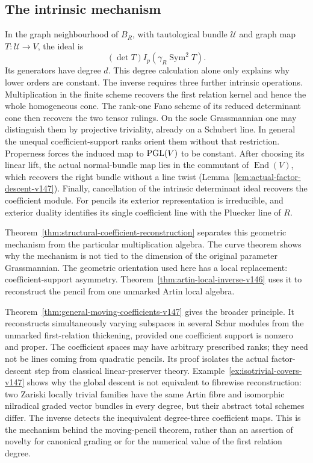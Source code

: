 \documentclass[11pt,reqno]{amsart}
\numberwithin{equation}{section}
\theoremstyle{definition}\newtheorem{definition}[theorem]{Definition}
\theoremstyle{remark}\newtheorem{remark}[theorem]{Remark}
\DeclareMathOperator{\Sym}{Sym}\DeclareMathOperator{\Gr}{Gr}
\DeclareMathOperator{\End}{End}
\begin{document}
\subsection{The intrinsic mechanism}
In the graph neighbourhood of \(B_R\), with tautological bundle
\(\mathcal U\) and graph map \(T:\mathcal U\to V\), the ideal is
\[
                 (\det T)I_p(\gamma_R\Sym^2T).
\]
Its generators have degree \(d\).  This degree calculation alone
only explains why lower orders are constant.  The inverse requires
three further intrinsic operations.  Multiplication in the finite
scheme recovers the first relation kernel and hence the whole
homogeneous cone.  The rank-one Fano scheme of its reduced determinant
cone then recovers the two tensor rulings.  On the socle Grassmannian
one may distinguish them by projective triviality, already on a
Schubert line.  In general the unequal coefficient-support ranks
orient them without that restriction.  Properness forces the induced
map to \(\operatorname{PGL}(V)\) to be constant.  After choosing its linear lift,
the actual normal-bundle map lies in the commutant of \(\End(V)\),
which recovers the right bundle without a line twist
(Lemma~\ref{lem:actual-factor-descent-v147}).  Finally, cancellation of the intrinsic
determinant ideal recovers the coefficient module.  For pencils its
exterior representation is irreducible, and exterior duality identifies
its single coefficient line with the Pluecker line of \(R\).

Theorem~\ref{thm:structural-coefficient-reconstruction} separates this
geometric mechanism from the particular multiplication algebra.  The
curve theorem shows why the mechanism is not tied to the dimension of
the original parameter Grassmannian.  The geometric orientation used here has a local replacement: coefficient-support asymmetry.  Theorem~\ref{thm:artin-local-inverse-v146} uses it to reconstruct the pencil from one unmarked Artin local algebra.

Theorem~\ref{thm:general-moving-coefficients-v147} gives the broader
principle.  It reconstructs simultaneously varying subspaces in
several Schur modules from the unmarked first-relation thickening,
provided one coefficient support is nonzero and proper.  The
coefficient spaces may have arbitrary prescribed ranks; they need
not be lines coming from quadratic pencils.  Its proof isolates the
actual factor-descent step from classical linear-preserver theory.
Example~\ref{ex:isotrivial-covers-v147} shows why the global descent is
not equivalent to fibrewise reconstruction: two Zariski locally
trivial families have the same Artin fibre and isomorphic nilradical
graded vector bundles in every degree, but their abstract total
schemes differ.  The inverse detects the inequivalent degree-three
coefficient maps.  This is the mechanism behind the moving-pencil
theorem, rather than
an assertion of novelty for canonical grading or for the numerical
value of the first relation degree.
\end{document}
